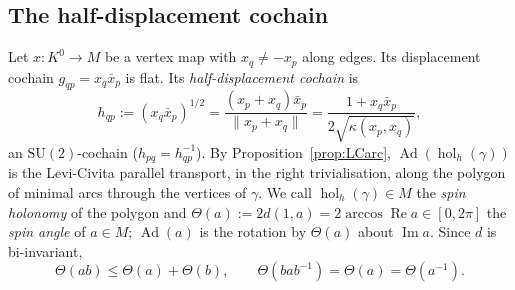 \documentclass[11pt,reqno]{amsart}
\theoremstyle{definition}
\theoremstyle{remark}
\numberwithin{equation}{section}
\newcommand{\Ad}{\operatorname{Ad}}
\newcommand{\re}{\operatorname{Re}}
\newcommand{\im}{\operatorname{Im}}
\newcommand{\SU}{\mathrm{SU}}
\newcommand{\hol}{\operatorname{hol}}
\begin{document}
\subsection{The half-displacement cochain}
Let $x\colon K^0\to M$ be a vertex map with $x_q\ne-x_p$ along edges.  Its displacement cochain
$g_{qp}=x_q\bar x_p$ is flat.  Its \emph{half-displacement cochain} is
\[
h_{qp}:=(x_q\bar x_p)^{1/2}=\frac{(x_p+x_q)\bar x_p}{\lVert x_p+x_q\rVert}=\frac{1+x_q\bar x_p}{2\sqrt{\kappa(x_p,x_q)}} ,
\]
an $\SU(2)$-cochain ($h_{pq}=h_{qp}^{-1}$).  By Proposition~\ref{prop:LCarc}, $\Ad(\hol_h(\gamma))$ is the
Levi-Civita parallel transport, in the right trivialisation, along the polygon of minimal arcs through the
vertices of $\gamma$.  We call $\hol_h(\gamma)\in M$ the \emph{spin holonomy} of the polygon and
$\Theta(a):=2d(1,a)=2\arccos\re a\in[0,2\pi]$ the \emph{spin angle} of $a\in M$; $\Ad(a)$ is the rotation by
$\Theta(a)$ about $\im a$.  Since $d$ is bi-invariant,
\begin{equation}\label{eq:subadd}
\Theta(ab)\le\Theta(a)+\Theta(b),\qquad\Theta(bab^{-1})=\Theta(a)=\Theta(a^{-1}).
\end{equation}
\end{document}
